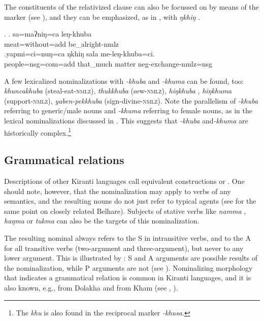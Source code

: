 The constituents of the relativized clause can also be focussed on by means of the  marker (see \Next[a]), and  they can be emphasized, as in \Next[b], with \emph{ŋkhiŋ} .

   \ex. \ag. sa=maʔniŋ=ca leŋ-khuba\\
		meat=without{\sc =add} be\_alright{\sc -nmlz}\\
	\bg.yapmi=ci=nuŋ=ca  ŋkhiŋ   sala   me-leŋ-khuba=ci.\\
		people{\sc =nsg=com=add} that\_much matter {\sc neg}-exchange-{\sc nmlz=nsg}\\
	      

	
A few lexicalized nominalizations with \emph{-khuba} and \emph{-khuma} can be found, too: \emph{khuncakhuba}  (steal-eat-\textsc{nmlz}), \emph{thukkhuba}  (sew-\textsc{nmlz}), \emph{hiŋ\-khuba} , \emph{hiŋ\-khuma}  (support-\textsc{nmlz}), \emph{yaben-pekkhuba}  (sign-div\-ine-\textsc{nmlz}). Note the parallelism of \emph{-khuba} referring to generic/male nouns and \emph{-khuma} referring to female nouns, as in the lexical nominalizations discussed in . This suggests that \emph{-khuba} and\emph{-khuma} are historically complex.\footnote{The  \emph{khu} is also found in the reciprocal marker \emph{-khusa}.}

\subsection{Grammatical relations}\label{khuba-gr}

Descriptions of other Kiranti languages call equivalent constructions  or  \citep{Tolsma1999A-grammar, Rutgers1998Yamphu, Ebert1997A-grammar, Ebert1999Nonfinite, Doornenbal2009A-grammar}. One should note, however, that the nominalization may apply to verbs of any semantics, and the resulting nouns do not just refer to typical agents (see \citet[180]{Bickel2004Hidden} for the same point on closely related Belhare). Subjects of stative verbs like \emph{namma} , \emph{haŋma}  or \emph{tukma}  can also be the targets of this nominalization. 
 
The resulting nominal always refers to the S in intransitive verbs, and to the A for all transitive verbs (two-argument and three-argument), but never to any lower argument. This is illustrated by \Next: S and A arguments are possible results of the nominalization, while P arguments are not (see \Next[c]). Nominalizing morphology that indicates a grammatical relation is common in Kiranti languages, and it is also known, e.g., from  Dolakha  and from Kham (see \citet[409]{Genetti1992Semantic}, \citealt[376]{Ebert1999Nonfinite}). 
	
